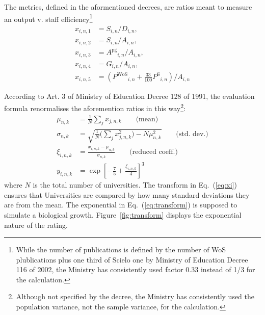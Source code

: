 \documentclass[twocolumn]{article}
\def\npup{\ensuremath{S}}
\def\nmaj{\ensuremath{D}}
\def\nprof{\ensuremath{A}}
\def\ngrad{\ensuremath{A^\text{pg}}}
\def\ngrant{\ensuremath{G}}
\def\nisi{\ensuremath{P^\text{WoS}}}
\def\nscielo{\ensuremath{P^\text{S}}}
\def\eqref#1{Eq.~(\ref{eq:#1})}
\begin{document}
The metrics, defined in the aformentioned decrees, are ratios meant to measure an output v. staff efficiency\footnote{While the number of publications is defined by the number of WoS plublications plus one third of Scielo one by Ministry of Education Decree 116 of 2002, the Ministry has consistently used factor 0.33 instead of 1/3 for the calculation.}
\begin{subequations}
\begin{align}
    x_{i,n,1} &= \npup_{i,n} / \nmaj_{i,n},  \label{eq:x1}             \\
    x_{i,n,2} &= \npup_{i,n} / \nprof_{i,n},                           \\ 
    x_{i,n,3} &= \ngrad_{i,n} / \nprof_{i,n},                          \\
    x_{i,n,4} &= \ngrant_{i,n} / \nprof_{i,n},                         \\
    x_{i,n,5} &= (\nisi_{i,n} + \frac{33}{100} \nscielo_{i,n}) / \nprof_{i,n}
\end{align}
\end{subequations}

According to Art. 3 of Ministry of Education Decree 128 of 1991,  the
evaluation formula renormalises the aforemention ratios in this
way\footnote{Although not specified by the decree, the Ministry has
consistently used the population variance, not the sample variance, for the calculation.}:
\begin{subequations}
\begin{align}
    \mu_{n,k}    &= \frac1N\sum_j x_{j,n,k}\qquad\text{(mean)} \label{eq:mu}\\
    \sigma_{n,k} &= \sqrt{\frac 1N \Big(\sum_j x_{j,n,k}^2\Big) - N\mu_{n,k}^2}\qquad\text{(std. dev.)} \label{eq:sigma}\\
    \xi_{i,n,k}  &= \frac{x_{i,n,k} - \mu_{n,k} }{\sigma_{n,k}} 
\qquad\text{(reduced coeff.)} \label{eq:xi}\\
    y_{i,n,k}    &= \exp \left[ -\frac 75 + \frac{\xi_{i,n,k}}4  \right]^3 \label{eq:transform}
\end{align}
\end{subequations}
where $N$ is the total number of universities.
The transform in \eqref{xi} ensures that Universities are compared by how many standard deviations they are from the mean. The exponential in \eqref{transform} is supposed to simulate a biological growth. Figure~\ref{fig:transform} displays the exponential nature of the rating.
\end{document}
